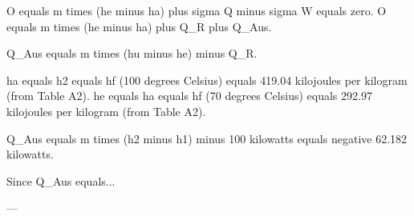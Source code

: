 O equals m times (he minus ha) plus sigma Q minus sigma W equals zero.  
O equals m times (he minus ha) plus Q_R plus Q_Aus.  

Q_Aus equals m times (hu minus he) minus Q_R.  

ha equals h2 equals hf (100 degrees Celsius) equals 419.04 kilojoules per kilogram (from Table A2).  
he equals ha equals hf (70 degrees Celsius) equals 292.97 kilojoules per kilogram (from Table A2).  

Q_Aus equals m times (h2 minus h1) minus 100 kilowatts equals negative 62.182 kilowatts.  

Since Q_Aus equals...  

---